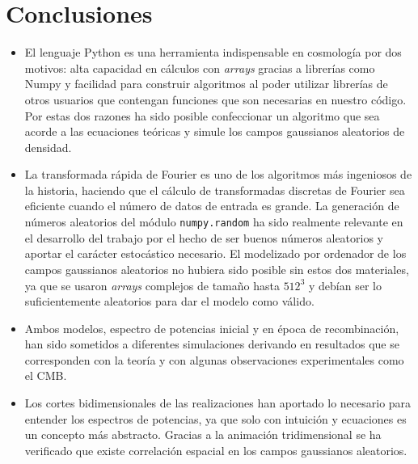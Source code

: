 \chapter{Conclusiones}
\begin{itemize}
    \item El lenguaje Python es una herramienta indispensable en cosmología por dos motivos: alta capacidad en cálculos con \textit{arrays} gracias a librerías como Numpy y facilidad para construir algoritmos al poder utilizar librerías de otros usuarios que contengan funciones que son necesarias en nuestro código. Por estas dos razones ha sido posible confeccionar un algoritmo que sea acorde a las ecuaciones teóricas y simule los campos gaussianos aleatorios de densidad.
    \item La transformada rápida de Fourier es uno de los algoritmos más ingeniosos de la historia, haciendo que el cálculo de transformadas discretas de Fourier sea eficiente cuando el número de datos de entrada es grande. La generación de números aleatorios del módulo \texttt{numpy.random} ha sido realmente relevante en el desarrollo del trabajo por el hecho de ser buenos números aleatorios y aportar el carácter estocástico necesario. El modelizado por ordenador de los campos gaussianos aleatorios no hubiera sido posible sin estos dos materiales, ya que se usaron \textit{arrays} complejos de tamaño hasta \(512^3\) y debían ser lo suficientemente aleatorios para dar el modelo como válido.
    \item Ambos modelos, espectro de potencias inicial y en época de recombinación, han sido sometidos a diferentes simulaciones derivando en resultados que se corresponden con la teoría y con algunas observaciones experimentales como el CMB.
    \item Los cortes bidimensionales de las realizaciones han aportado lo necesario para entender los espectros de potencias, ya que solo con intuición y ecuaciones es un concepto más abstracto. Gracias a la animación tridimensional se ha verificado que existe correlación espacial en los campos gaussianos aleatorios.
\end{itemize}
